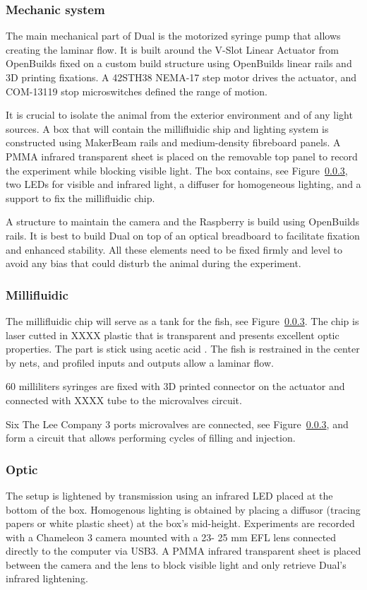   \subsubsection{Mechanic system}
  The main mechanical part of Dual is the motorized syringe pump that allows creating the laminar flow. It is built around the V-Slot Linear Actuator from OpenBuilds fixed on a custom build structure using OpenBuilds linear rails and 3D printing fixations. A 42STH38 NEMA-17 step motor drives the actuator, and COM-13119 stop microswitches defined the range of motion.

  It is crucial to isolate the animal from the exterior environment and of any light sources. A box that will contain the millifluidic ship and lighting system is constructed using MakerBeam rails and medium-density fibreboard panels. A PMMA infrared transparent sheet is placed on the removable top panel to record the experiment while blocking visible light. The box contains, see Figure~\ref{}, two LEDs for visible and infrared light, a diffuser for homogeneous lighting, and a support to fix the millifluidic chip.

  A structure to maintain the camera and the Raspberry is build using OpenBuilds rails. It is best to build Dual on top of an optical breadboard to facilitate fixation and enhanced stability. All these elements need to be fixed firmly and level to avoid any bias that could disturb the animal during the experiment.

  \subsubsection{Millifluidic}
  The millifluidic chip will serve as a tank for the fish, see Figure~\ref{}. The chip is laser cutted in XXXX plastic that is transparent and presents excellent optic properties. The part is stick using acetic acid \cite{}. The fish is restrained in the center by nets, and profiled inputs and outputs allow a laminar flow.

  60 milliliters syringes are fixed with 3D printed connector on the actuator and connected with XXXX tube to the microvalves circuit.

  Six The Lee Company 3 ports microvalves are connected, see Figure~\ref{}, and form a circuit that allows performing cycles of filling and injection.

  \subsubsection{Optic}
  The setup is lightened by transmission using an infrared LED placed at the bottom of the box. Homogenous lighting is obtained by placing a diffusor (tracing papers or white plastic sheet) at the box's mid-height. Experiments are recorded with a Chameleon 3 camera mounted with a 23- 25 mm EFL lens connected directly to the computer via USB3. A PMMA infrared transparent sheet is placed between the camera and the lens to block visible light and only retrieve Dual's infrared lightening.

